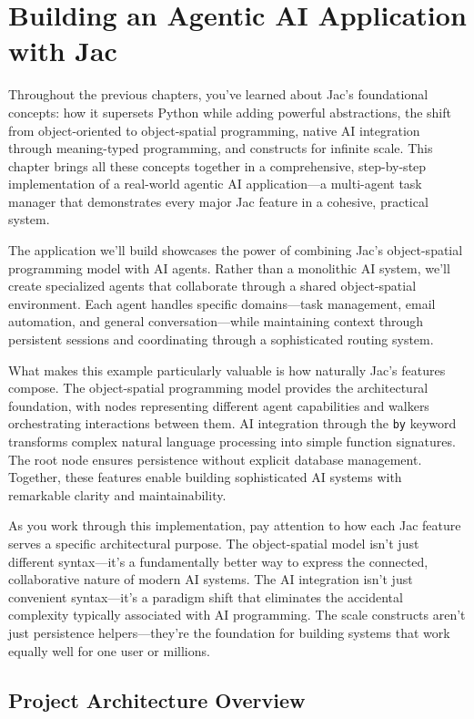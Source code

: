 \chapter{Building an Agentic AI Application with Jac}

Throughout the previous chapters, you've learned about Jac's foundational concepts: how it supersets Python while adding powerful abstractions, the shift from object-oriented to object-spatial programming, native AI integration through meaning-typed programming, and constructs for infinite scale. This chapter brings all these concepts together in a comprehensive, step-by-step implementation of a real-world agentic AI application—a multi-agent task manager that demonstrates every major Jac feature in a cohesive, practical system.

The application we'll build showcases the power of combining Jac's object-spatial programming model with AI agents. Rather than a monolithic AI system, we'll create specialized agents that collaborate through a shared object-spatial environment. Each agent handles specific domains—task management, email automation, and general conversation—while maintaining context through persistent sessions and coordinating through a sophisticated routing system.

What makes this example particularly valuable is how naturally Jac's features compose. The object-spatial programming model provides the architectural foundation, with nodes representing different agent capabilities and walkers orchestrating interactions between them. AI integration through the \texttt{by} keyword transforms complex natural language processing into simple function signatures. The root node ensures persistence without explicit database management. Together, these features enable building sophisticated AI systems with remarkable clarity and maintainability.

As you work through this implementation, pay attention to how each Jac feature serves a specific architectural purpose. The object-spatial model isn't just different syntax—it's a fundamentally better way to express the connected, collaborative nature of modern AI systems. The AI integration isn't just convenient syntax—it's a paradigm shift that eliminates the accidental complexity typically associated with AI programming. The scale constructs aren't just persistence helpers—they're the foundation for building systems that work equally well for one user or millions.

\section{Project Architecture Overview}

